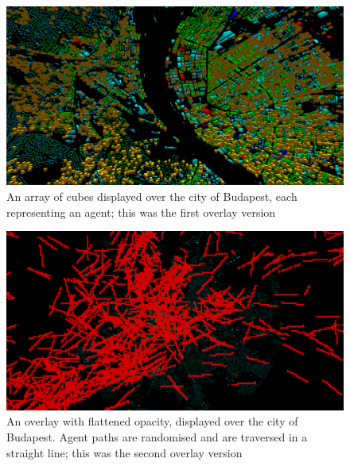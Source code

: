 \appendix
\chapter*{\fuggelek}
\setcounter{chapter}{\appendixnumber}

\begin{figure}[h]
    \centering
    \includegraphics[width=140mm, keepaspectratio]{images/overlay_v1.png}
    \caption{An array of cubes displayed over the city of Budapest, each representing an agent; this was the first overlay version\ \label{overlay_v1}}
\end{figure}
\begin{figure}[h]
    \centering
    \includegraphics[width=140mm, keepaspectratio]{images/overlay_v2.png}
    \caption{An overlay with flattened opacity, displayed over the city of Budapest. Agent paths are randomised and are traversed in a straight line; this was the second overlay version\ \label{overlay_v2}}
\end{figure}

